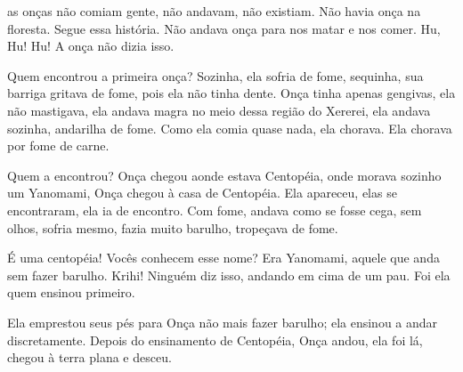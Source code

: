  

 as onças não comiam gente, não andavam, não existiam. Não
havia onça na floresta. Segue essa história. Não andava onça para nos
matar e nos comer. Hu, Hu! Hu! A onça não dizia isso. 

Quem encontrou a primeira onça? Sozinha, ela sofria de fome, sequinha,
sua barriga gritava de fome, pois ela não tinha dente. Onça tinha apenas
gengivas, ela não mastigava, ela andava magra no meio dessa região do
Xererei, ela andava sozinha, andarilha de fome. Como ela comia quase
nada, ela chorava. Ela chorava por fome de carne. 

Quem a encontrou? Onça chegou aonde estava Centopéia, onde morava
sozinho um Yanomami, Onça chegou à casa de Centopéia. Ela apareceu, elas
se encontraram, ela ia de encontro. Com fome, andava como se fosse cega,
sem olhos, sofria mesmo, fazia muito barulho, tropeçava de fome. 

É uma centopéia! Vocês conhecem esse nome? Era Yanomami, aquele que anda
sem fazer barulho. Krihi! Ninguém diz isso, andando em cima de um pau.
Foi ela quem ensinou primeiro. 

Ela emprestou seus pés para Onça não mais fazer barulho; ela ensinou a
andar discretamente. Depois do ensinamento de Centopéia, Onça andou, ela
foi lá, chegou à terra plana e desceu.

 
